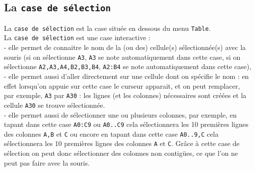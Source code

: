 \documentclass[a4paper,11pt]{book}
\begin{document}
\subsection{La {\tt case de s\'election}}
La {\tt case de s\'election} est la case situ\'ee en dessous du menu 
{\tt Table}.\\ 
La {\tt case de s\'election} est une case interactive :\\
- elle permet de connaitre le nom de la (ou des) cellule(s) s\'electionn\'ee(s)
avec la souris (si on s\'electionne {\tt A3}, {\tt A3} se note automatiquement dans cette case, si on s\'electionne {\tt A2,A3,A4,B2,B3,B4}, {\tt A2:B4} se note automatiquement dans cette case),\\
- elle permet aussi d'aller directement sur une cellule dont on sp\'ecifie le 
nom : en effet lorsqu'on appuie sur cette case le curseur apparait, et on peut 
remplacer, par exemple, {\tt A3} par {\tt A30} : les lignes (et les colonnes) 
n\'ecessaires sont cr\'e\'ees et la cellule {\tt A30} se trouve 
s\'electionn\'ee.\\
- elle permet aussi de s\'electionner une ou plusieurs colonnes, par exemple,
  en tapant dans cette case {\tt A0:C9} ou {\tt A0..C9} cela  s\'electionnera 
les 10 premi\`eres lignes des colonnes {\tt A,B} et {\tt C} ou encore
en tapant dans cette case {\tt A0..9,C} cela  s\'electionnera les 10 
premi\`eres lignes des colonnes {\tt A} et {\tt C}. Gr\^ace \`a cette case 
de s\'election on peut donc s\'electionner des colonnes non contig\"ues, ce que 
l'on ne peut pas faire avec la souris.
\end{document}
